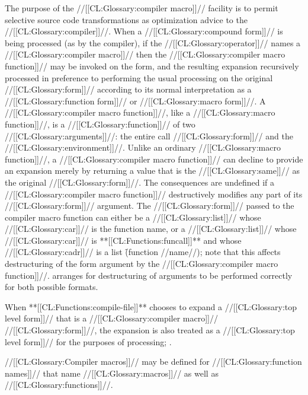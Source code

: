 The purpose of the //[[CL:Glossary:compiler macro]]// facility is to permit  selective source code transformations as optimization advice  to the //[[CL:Glossary:compiler]]//.  When a //[[CL:Glossary:compound form]]// is being processed (as by the compiler), if the //[[CL:Glossary:operator]]// names a //[[CL:Glossary:compiler macro]]// then the //[[CL:Glossary:compiler macro function]]// may be invoked on the form, and the resulting expansion recursively processed in preference to performing the usual processing on the original //[[CL:Glossary:form]]// according to its normal interpretation as a //[[CL:Glossary:function form]]// or //[[CL:Glossary:macro form]]//.
  A //[[CL:Glossary:compiler macro function]]//, like a //[[CL:Glossary:macro function]]//, is a //[[CL:Glossary:function]]// of two //[[CL:Glossary:arguments]]//: the entire call //[[CL:Glossary:form]]// and the //[[CL:Glossary:environment]]//. Unlike an ordinary //[[CL:Glossary:macro function]]//, a  //[[CL:Glossary:compiler macro function]]// can decline to provide an expansion merely by returning a value that is the //[[CL:Glossary:same]]// as the original //[[CL:Glossary:form]]//. The consequences are undefined if a //[[CL:Glossary:compiler macro function]]// destructively modifies any part of its //[[CL:Glossary:form]]// argument.
  The //[[CL:Glossary:form]]// passed to the compiler macro function can either be a //[[CL:Glossary:list]]// whose //[[CL:Glossary:car]]// is the function name, or a //[[CL:Glossary:list]]// whose //[[CL:Glossary:car]]// is **[[CL:Functions:funcall]]** and whose //[[CL:Glossary:cadr]]// is a list \f{(function //name//)}; note that this affects destructuring of the form argument by the  //[[CL:Glossary:compiler macro function]]//.  arranges for destructuring of arguments to be performed correctly for both possible formats.

When **[[CL:Functions:compile-file]]** chooses to expand a //[[CL:Glossary:top level form]]// that is a //[[CL:Glossary:compiler macro]]// //[[CL:Glossary:form]]//, the expansion is also treated as a //[[CL:Glossary:top level form]]// for the purposes of  processing; \seesection\TopLevelForms.

\endsubsubsubsection%

  //[[CL:Glossary:Compiler macros]]// may be defined for //[[CL:Glossary:function names]]// that name //[[CL:Glossary:macros]]// as well as //[[CL:Glossary:functions]]//.  

